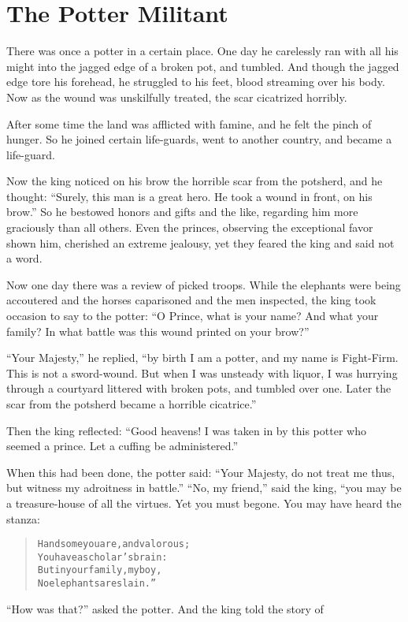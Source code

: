 \documentclass[article, twoside, 14pt]{memoir}
\renewenvironment{verbatim}{%
\begin{quote}%
\vskip -10pt%
\begin{alltt}\normalfont\large}{\end{alltt}%
\end{quote}%
\vskip -10pt
} %
\begin{document}
\chapter{The Potter Militant}

\label{s69}

There was once a potter in a certain place. One day he carelessly
ran with all his might into the jagged edge of a broken pot, and
tumbled. And though the jagged edge tore his forehead, he struggled
to his feet, blood streaming over his body. Now as the wound was
unskilfully treated, the scar cicatrized horribly.

After some time the land was afflicted with famine, and he felt the
pinch of hunger. So he joined certain life-guards, went to another
country, and became a life-guard.

Now the king noticed on his brow the horrible scar from the
potsherd, and he thought:
``Surely, this man is a great hero. He took a wound in front, on his brow.''
So he bestowed honors and gifts and the like, regarding him more
graciously than all others. Even the princes, observing the
exceptional favor shown him, cherished an extreme jealousy, yet
they feared the king and said not a word.

Now one day there was a review of picked troops. While the
elephants were being accoutered and the horses caparisoned and the
men inspected, the king took occasion to say to the potter:
``O Prince, what is your name? And what your family? In what battle was this wound printed on your brow?''


``Your Majesty,'' he replied,
``by birth I am a potter, and my name is Fight-Firm. This is not a sword-wound. But when I was unsteady with liquor, I was hurrying through a courtyard littered with broken pots, and tumbled over one. Later the scar from the potsherd became a horrible cicatrice.''

Then the king reflected:
``Good heavens! I was taken in by this potter who seemed a prince. Let a cuffing be administered.''

When this had been done, the potter said:
``Your Majesty, do not treat me thus, but witness my adroitness in battle.''
``No, my friend,'' said the king, “you may be a treasure-house of
all the virtues. Yet you must begone. You may have heard the
stanza:

\begin{verbatim}
Handsome you are, and valorous;
    You have a scholar's brain:
But in your family, my boy,
    No elephants are slain.”
\end{verbatim}
``How was that?'' asked the potter. And the king told the story of
\end{document}

